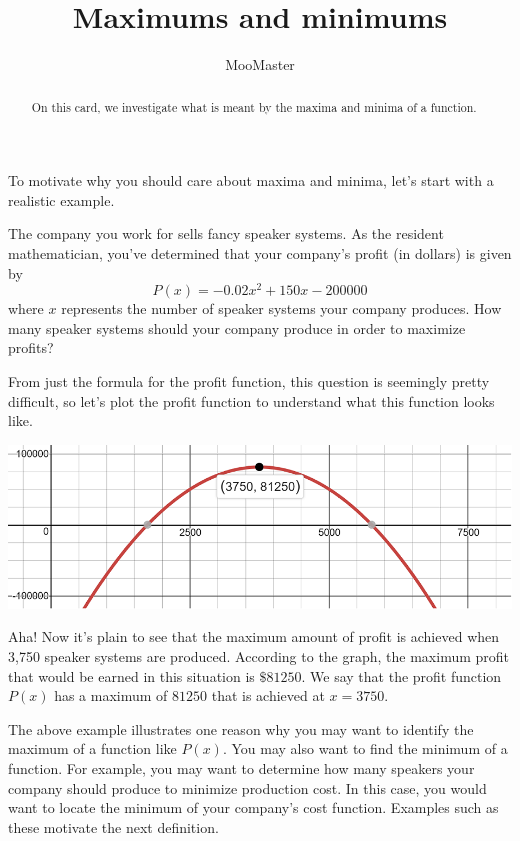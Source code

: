 \documentclass{ximera}
\title[Dig-In]{Maximums and minimums}
\author{MooMaster}
\begin{document}
\begin{abstract}
On this card, we investigate what is meant by the maxima and minima of a function.  
\end{abstract}
\maketitle

To motivate why you should care about maxima and minima, let's start with a realistic example. 

\begin{example}
The company you work for sells fancy speaker systems.  As the resident mathematician, you've determined that your company's profit (in dollars) is given by 
\[ P(x) = -0.02x^2 + 150x-200000 \]
where $x$ represents the number of speaker systems your company produces.  How many speaker systems should your company produce in order to maximize profits? 
\begin{explanation}
From just the formula for the profit function, this question is seemingly pretty difficult, so let's plot the profit function to understand what this function looks like.  

\begin{center} \includegraphics[scale=0.5]{extrema1new.png} \end{center}

\underline{\hspace{5in}}

Aha!  Now it's plain to see that the maximum amount of profit is achieved when 3,750 speaker systems are produced.  According to the graph, the maximum profit that would be earned in this situation is $\$81250$.  We say that the profit function $P(x)$ has a maximum of $81250$ that is achieved at $x=3750$.  

\end{explanation}
\end{example}

The above example illustrates one reason why you may want to identify the maximum of a function like $P(x)$.  You may also want to find the minimum of a function.  For example, you may want to determine how many speakers your company should produce to minimize production cost.  In this case, you would want to locate the minimum of your company's cost function.  Examples such as these motivate the next definition. 
\end{document}
